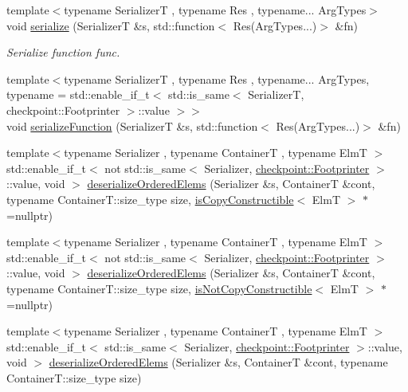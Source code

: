 \begin{DoxyCompactItemize}
\item 
{\footnotesize template$<$typename SerializerT , typename Res , typename... Arg\+Types$>$ }\\void \hyperlink{namespacecheckpoint_ad3043fe034b7bf1d0d864e1e819c84d4}{serialize} (SerializerT \&s, std\+::function$<$ Res(Arg\+Types...)$>$ \&fn)
\begin{DoxyCompactList}\small\item\em Serialize function {\ttfamily func}. \end{DoxyCompactList}\item 
{\footnotesize template$<$typename SerializerT , typename Res , typename... Arg\+Types, typename  = std\+::enable\+\_\+if\+\_\+t$<$    std\+::is\+\_\+same$<$      Serializer\+T,      checkpoint\+::\+Footprinter    $>$\+::value  $>$$>$ }\\void \hyperlink{namespacecheckpoint_a4161978e6d6de385d942cbcbe659817a}{serialize\+Function} (SerializerT \&s, std\+::function$<$ Res(Arg\+Types...)$>$ \&fn)
\item 
{\footnotesize template$<$typename Serializer , typename ContainerT , typename ElmT $>$ }\\std\+::enable\+\_\+if\+\_\+t$<$ not std\+::is\+\_\+same$<$ Serializer, \hyperlink{structcheckpoint_1_1_footprinter}{checkpoint\+::\+Footprinter} $>$\+::value, void $>$ \hyperlink{namespacecheckpoint_af1b8445cbd2caf9c35727de1cf63c2d9}{deserialize\+Ordered\+Elems} (Serializer \&s, ContainerT \&cont, typename Container\+T\+::size\+\_\+type size, \hyperlink{namespacecheckpoint_a60a9850fa59d4b236b2f888baf135a95}{is\+Copy\+Constructible}$<$ ElmT $>$ $\ast$=nullptr)
\item 
{\footnotesize template$<$typename Serializer , typename ContainerT , typename ElmT $>$ }\\std\+::enable\+\_\+if\+\_\+t$<$ not std\+::is\+\_\+same$<$ Serializer, \hyperlink{structcheckpoint_1_1_footprinter}{checkpoint\+::\+Footprinter} $>$\+::value, void $>$ \hyperlink{namespacecheckpoint_abec445c1387cfe9c00c3c328b403378b}{deserialize\+Ordered\+Elems} (Serializer \&s, ContainerT \&cont, typename Container\+T\+::size\+\_\+type size, \hyperlink{namespacecheckpoint_a141a100f9dcca06fb0b6dbf44a5d6756}{is\+Not\+Copy\+Constructible}$<$ ElmT $>$ $\ast$=nullptr)
\item 
{\footnotesize template$<$typename Serializer , typename ContainerT , typename ElmT $>$ }\\std\+::enable\+\_\+if\+\_\+t$<$ std\+::is\+\_\+same$<$ Serializer, \hyperlink{structcheckpoint_1_1_footprinter}{checkpoint\+::\+Footprinter} $>$\+::value, void $>$ \hyperlink{namespacecheckpoint_a9976fffc8f39073e5b40ec61d93a5482}{deserialize\+Ordered\+Elems} (Serializer \&s, ContainerT \&cont, typename Container\+T\+::size\+\_\+type size)

\end{DoxyCompactItemize}
